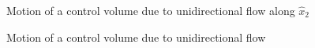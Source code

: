 \begin{figure}[h]
\begin{center}
\end{center}
\caption{Motion of a control volume due to unidirectional flow along $\hat{x}_2$}
\label{CVTranslation2}
\end{figure}



\begin{figure}[h]
\begin{center}
\end{center}
\caption{Motion of a control volume due to unidirectional flow}
\label{CVTranslation3}
\end{figure}

